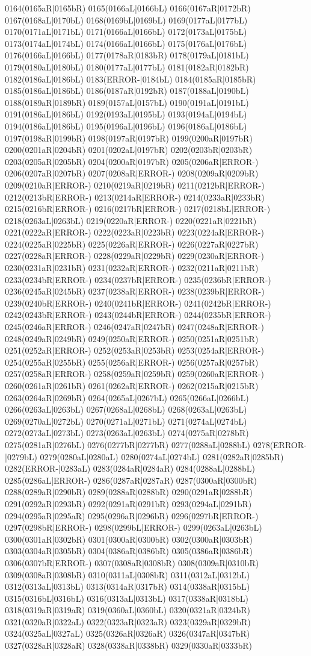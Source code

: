 0164(0165aR|0165bR) 0165(0166aL|0166bL) 0166(0167aR|0172bR) 0167(0168aL|0170bL) 0168(0169bL|0169bL) 0169(0177aL|0177bL) 0170(0171aL|0171bL) 0171(0166aL|0166bL) 0172(0173aL|0175bL) 0173(0174aL|0174bL) 0174(0166aL|0166bL) 0175(0176aL|0176bL) 0176(0166aL|0166bL) 0177(0178aR|0183bR) 0178(0179aL|0181bL) 0179(0180aL|0180bL) 0180(0177aL|0177bL) 0181(0182aR|0182bR) 0182(0186aL|0186bL) 0183(ERROR-|0184bL) 0184(0185aR|0185bR) 0185(0186aL|0186bL) 0186(0187aR|0192bR) 0187(0188aL|0190bL) 0188(0189aR|0189bR) 0189(0157aL|0157bL) 0190(0191aL|0191bL) 0191(0186aL|0186bL) 0192(0193aL|0195bL) 0193(0194aL|0194bL) 0194(0186aL|0186bL) 0195(0196aL|0196bL) 0196(0186aL|0186bL) 0197(0198aR|0199bR) 0198(0197aR|0197bR) 0199(0200aR|0197bR) 0200(0201aR|0204bR) 0201(0202aL|0197bR) 0202(0203bR|0203bR) 0203(0205aR|0205bR) 0204(0200aR|0197bR) 0205(0206aR|ERROR-) 0206(0207aR|0207bR) 0207(0208aR|ERROR-) 0208(0209aR|0209bR) 0209(0210aR|ERROR-) 0210(0219aR|0219bR) 0211(0212bR|ERROR-) 0212(0213bR|ERROR-) 0213(0214aR|ERROR-) 0214(0233aR|0233bR) 0215(0216bR|ERROR-) 0216(0217bR|ERROR-) 0217(0218bL|ERROR-) 0218(0263aL|0263bL) 0219(0220aR|ERROR-) 0220(0221aR|0221bR) 0221(0222aR|ERROR-) 0222(0223aR|0223bR) 0223(0224aR|ERROR-) 0224(0225aR|0225bR) 0225(0226aR|ERROR-) 0226(0227aR|0227bR) 0227(0228aR|ERROR-) 0228(0229aR|0229bR) 0229(0230aR|ERROR-) 0230(0231aR|0231bR) 0231(0232aR|ERROR-) 0232(0211aR|0211bR) 0233(0234bR|ERROR-) 0234(0237bR|ERROR-) 0235(0236bR|ERROR-) 0236(0245aR|0245bR) 0237(0238aR|ERROR-) 0238(0239bR|ERROR-) 0239(0240bR|ERROR-) 0240(0241bR|ERROR-) 0241(0242bR|ERROR-) 0242(0243bR|ERROR-) 0243(0244bR|ERROR-) 0244(0235bR|ERROR-) 0245(0246aR|ERROR-) 0246(0247aR|0247bR) 0247(0248aR|ERROR-) 0248(0249aR|0249bR) 0249(0250aR|ERROR-) 0250(0251aR|0251bR) 0251(0252aR|ERROR-) 0252(0253aR|0253bR) 0253(0254aR|ERROR-) 0254(0255aR|0255bR) 0255(0256aR|ERROR-) 0256(0257aR|0257bR) 0257(0258aR|ERROR-) 0258(0259aR|0259bR) 0259(0260aR|ERROR-) 0260(0261aR|0261bR) 0261(0262aR|ERROR-) 0262(0215aR|0215bR) 0263(0264aR|0269bR) 0264(0265aL|0267bL) 0265(0266aL|0266bL) 0266(0263aL|0263bL) 0267(0268aL|0268bL) 0268(0263aL|0263bL) 0269(0270aL|0272bL) 0270(0271aL|0271bL) 0271(0274aL|0274bL) 0272(0273aL|0273bL) 0273(0263aL|0263bL) 0274(0275aR|0278bR) 0275(0281aR|0276bL) 0276(0277bR|0277bR) 0277(0288aL|0288bL) 0278(ERROR-|0279bL) 0279(0280aL|0280aL) 0280(0274aL|0274bL) 0281(0282aR|0285bR) 0282(ERROR-|0283aL) 0283(0284aR|0284aR) 0284(0288aL|0288bL) 0285(0286aL|ERROR-) 0286(0287aR|0287aR) 0287(0300aR|0300bR) 0288(0289aR|0290bR) 0289(0288aR|0288bR) 0290(0291aR|0288bR) 0291(0292aR|0293bR) 0292(0291aR|0291bR) 0293(0294aL|0291bR) 0294(0295aR|0295aR) 0295(0296aR|0296bR) 0296(0297bR|ERROR-) 0297(0298bR|ERROR-) 0298(0299bL|ERROR-) 0299(0263aL|0263bL) 0300(0301aR|0302bR) 0301(0300aR|0300bR) 0302(0300aR|0303bR) 0303(0304aR|0305bR) 0304(0386aR|0386bR) 0305(0386aR|0386bR) 0306(0307bR|ERROR-) 0307(0308aR|0308bR) 0308(0309aR|0310bR) 0309(0308aR|0308bR) 0310(0311aL|0308bR) 0311(0312aL|0312bL) 0312(0313aL|0313bL) 0313(0314aR|0317bR) 0314(0338aR|0315bL) 0315(0316bL|0316bL) 0316(0313aL|0313bL) 0317(0338aR|0318bL) 0318(0319aR|0319aR) 0319(0360aL|0360bL) 0320(0321aR|0324bR) 0321(0320aR|0322aL) 0322(0323aR|0323aR) 0323(0329aR|0329bR) 0324(0325aL|0327aL) 0325(0326aR|0326aR) 0326(0347aR|0347bR) 0327(0328aR|0328aR) 0328(0338aR|0338bR) 0329(0330aR|0333bR) 